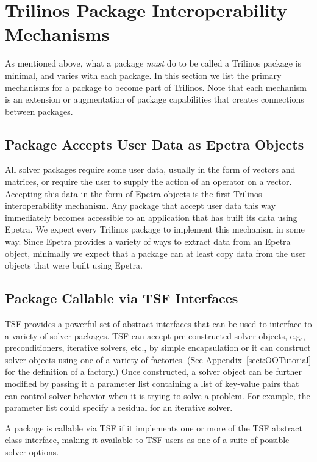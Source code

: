 \documentclass[12pt,strict]{SANDreport}
\begin{document}
\section{Trilinos Package Interoperability Mechanisms}
\label{sect:PackageDefinition}
As mentioned above, what a package {\it must} do to be called a Trilinos
package is minimal, and varies with each package.  In this section we
list the primary mechanisms for a package to become part of Trilinos.
Note that each mechanism is an extension or augmentation of package
capabilities that creates connections between packages.  

\subsection{Package Accepts User Data as Epetra Objects}
All solver packages require some user data, usually in the form of
vectors and matrices, or require the user to supply the action of an
operator on a vector.  Accepting this data in the form of Epetra
objects is the first Trilinos interoperability mechanism.  Any package
that accept user data this way immediately becomes accessible to an
application that has built its data using Epetra.  We expect every
Trilinos package to implement this mechanism in some way.  Since
Epetra provides a variety of ways to extract data from an Epetra
object, minimally we expect that a package can at least copy data from
the user objects that were built using Epetra.

\subsection{Package Callable via TSF Interfaces}
TSF provides a powerful set of abstract interfaces that can be used to
interface to a variety of solver packages.  TSF can accept
pre-constructed solver objects, e.g., preconditioners, iterative
solvers, etc., by simple encapsulation or it can
construct solver objects using one of a variety of factories.  (See
Appendix~\ref{sect:OOTutorial} for the definition of a factory.)  Once
constructed, a solver object can be further modified by passing it a
parameter list containing a list of key-value pairs that can control
solver behavior when it is trying to solve a problem.  For example,
the parameter list could specify a residual for an iterative solver.

A package is callable via TSF if it implements one or more of the TSF
abstract class interface, making it available to TSF users as one of a
suite of possible solver options.
\end{document}
